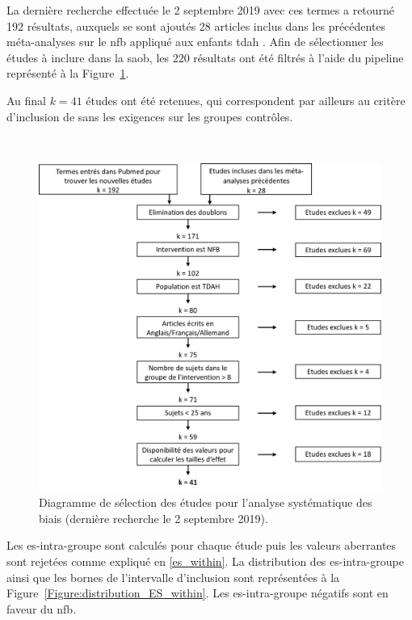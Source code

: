 La dernière recherche effectuée le 2 septembre 2019 avec ces termes a retourné 192 résultats, auxquels se sont ajoutés 28 articles inclus dans les précédentes 
méta-analyses sur le \gls{nfb} appliqué aux enfants \gls{tdah} \citep{Arns2009, Sonuga-Barke2013, Micoulaud2014, 
Cortese2016, Catala2017, VanDoren2019, Riesco2019, Bussalb2019clinical}. 
Afin de sélectionner les études à inclure dans la \gls{saob}, les 220 résultats ont été filtrés à l'aide du pipeline représenté à la 
Figure~\ref{Figure:factors_pipeline_selection_studies}. 

Au final $k = 41$ études ont été retenues, qui correspondent par ailleurs au critère d'inclusion de
\citet{Cortese2016} sans les exigences sur les groupes contrôles. 

\newpage\
\begin{figure}[h!]
  \centering
	\includegraphics[width=1\linewidth]{figures/chapter-3/factors-selection-studies} 
  \caption{Diagramme de sélection des études pour l'analyse systématique des biais (dernière recherche le 2 septembre 2019).} 
  \label{Figure:factors_pipeline_selection_studies}
\end{figure}

Les \gls{es}-intra-groupe sont calculés pour chaque étude puis les valeurs aberrantes sont rejetées comme expliqué en \ref{es_within}. 
La distribution des \gls{es}-intra-groupe ainsi que les bornes de l'intervalle d'inclusion sont représentées à la 
Figure~\ref{Figure:distribution_ES_within}. Les \gls{es}-intra-groupe négatifs sont en faveur du \gls{nfb}.

